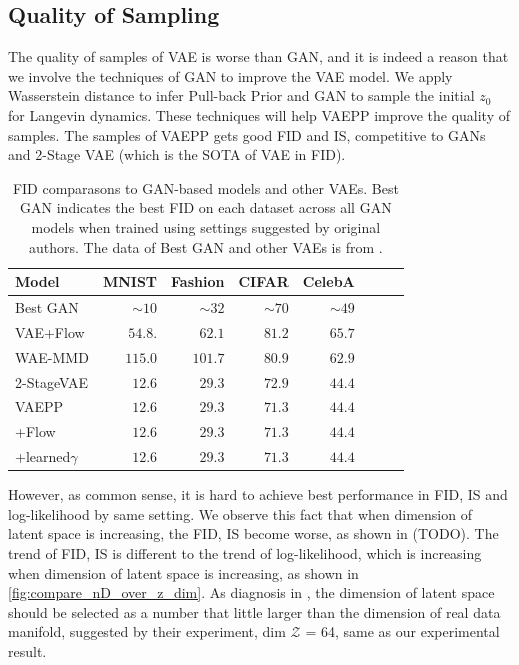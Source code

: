\subsection{Quality of Sampling}
The quality of samples of VAE is worse than GAN, and it is indeed a reason that we involve the techniques of GAN to improve the VAE model. We apply Wasserstein distance to infer Pull-back Prior and GAN to sample the initial $z_0$ for Langevin dynamics. These techniques will help VAEPP improve the quality of samples. The samples of VAEPP gets good FID and IS, competitive to GANs and 2-Stage VAE (which is the SOTA of VAE in FID). 
\begin{table}[tb]
\centering
\begin{tabular}{lrrrrrrr}  
\toprule
Model & MNIST & Fashion & CIFAR & CelebA\\
\midrule
Best GAN   & $\sim10$& $\sim32$&$\sim70$& $\sim49$\\
VAE+Flow   & $54.8$. & $62.1$  & $81.2$ & $65.7$\\
WAE-MMD    & $115.0$ & $101.7$ & $80.9$ & $62.9$\\
2-StageVAE & $12.6$  & $29.3$  & $72.9$ & $44.4$\\
VAEPP      & $12.6$  & $29.3$  & $71.3$ & $44.4$ \\
\quad +Flow      & $12.6$  & $29.3$  & $71.3$ & $44.4$ \\
\quad +learned$\gamma$  & $12.6$  & $29.3$  & $71.3$ & $44.4$ \\
\bottomrule
\end{tabular}
\caption{FID comparasons to GAN-based models and other VAEs. Best GAN indicates the best FID on each dataset across all GAN models when trained using settings suggested by original authors. The data of Best GAN and other VAEs is from \protect\cite{dai2019diagnosing}. }
\label{tab:compare_FID}
\end{table}
However, as common sense, it is hard to achieve best performance in FID, IS and log-likelihood by same setting. We observe this fact that when dimension of latent space is increasing, the FID, IS become worse, as shown in (TODO). The trend of FID, IS is different to the trend of log-likelihood, which is increasing when dimension of latent space is increasing, as shown in \cref{fig:compare_nD_over_z_dim}. As diagnosis in \cite{dai2019diagnosing}, the dimension of latent space should be selected as a number that little larger than the dimension of real data manifold, suggested by their experiment, dim $\mathcal{Z}$ = 64, same as our experimental result.  

